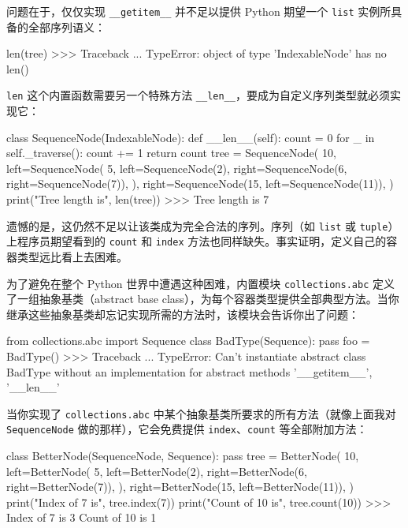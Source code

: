 问题在于，仅仅实现 \texttt{\_\_getitem\_\_} 并不足以提供 Python 期望一个 \texttt{list} 实例所具备的全部序列语义：

\begin{codebox}[python]
len(tree)
>>>
Traceback ...
TypeError: object of type 'IndexableNode' has no len()
\end{codebox}

\texttt{len} 这个内置函数需要另一个特殊方法 \texttt{\_\_len\_\_}，要成为自定义序列类型就必须实现它：

\begin{codebox}[python]
class SequenceNode(IndexableNode):
    def __len__(self):
        count = 0
        for _ in self._traverse():
            count += 1
        return count
tree = SequenceNode(
    10,
    left=SequenceNode(
        5,
        left=SequenceNode(2),
        right=SequenceNode(6, right=SequenceNode(7)),
    ),
    right=SequenceNode(15, left=SequenceNode(11)),
)
print("Tree length is", len(tree))
>>>
Tree length is 7
\end{codebox}

遗憾的是，这仍然不足以让该类成为完全合法的序列。序列（如 \texttt{list} 或 \texttt{tuple}）上程序员期望看到的 \texttt{count} 和 \texttt{index} 方法也同样缺失。事实证明，定义自己的容器类型远比看上去困难。

为了避免在整个 Python 世界中遭遇这种困难，内置模块 \texttt{collections.abc} 定义了一组抽象基类（abstract base class），为每个容器类型提供全部典型方法。当你继承这些抽象基类却忘记实现所需的方法时，该模块会告诉你出了问题：

\begin{codebox}[python]
from collections.abc import Sequence
class BadType(Sequence):
    pass
foo = BadType()
>>>
Traceback ...
TypeError: Can't instantiate abstract class BadType without an
implementation for abstract methods '__getitem__', '__len__'
\end{codebox}

当你实现了 \texttt{collections.abc} 中某个抽象基类所要求的所有方法（就像上面我对 \texttt{SequenceNode} 做的那样），它会免费提供 \texttt{index}、\texttt{count} 等全部附加方法：

\begin{codebox}[python]
class BetterNode(SequenceNode, Sequence):
    pass
tree = BetterNode(
    10,
    left=BetterNode(
        5,
        left=BetterNode(2),
        right=BetterNode(6, right=BetterNode(7)),
    ),
    right=BetterNode(15, left=BetterNode(11)),
)
print("Index of 7 is", tree.index(7))
print("Count of 10 is", tree.count(10))
>>>
Index of 7 is 3
Count of 10 is 1
\end{codebox}

